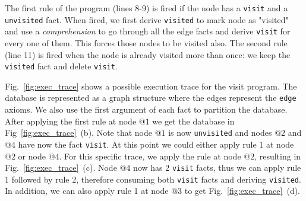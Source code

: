 The first rule of the program (lines 8-9) is fired if the node has a \texttt{visit} and a \texttt{unvisited} fact. When fired, we first derive \texttt{visited} to mark node as "visited" and use a
\emph{comprehension} to go through all the edge facts and derive \texttt{visit} for every one of them.
This forces those nodes to be visited also. The second rule (line 11) is fired when the node is already
visited more than once: we keep the \texttt{visited} fact and delete \texttt{visit}.

Fig.~\ref{fig:exec_trace} shows a possible execution trace for the visit program.
The database is represented as a graph structure where the edges represent the \texttt{edge}
axioms. We also use the first argument of each fact to partition the database.
After applying the first rule at node $@1$ we get the database in Fig~\ref{fig:exec_trace}~(b). Note that node $@1$ is now \texttt{unvisited} and nodes $@2$
and $@4$ have now the fact \texttt{visit}. At this point we could either apply rule 1 at
node $@2$ or node $@4$. For this specific trace, we apply the rule at node $@2$, resulting
in Fig.~\ref{fig:exec_trace}~(c). Node $@4$ now has 2 \texttt{visit} facts, thus
we can apply rule 1 followed by rule 2, therefore consuming both \texttt{visit} facts
and deriving \texttt{visited}. In addition, we can also apply rule 1 at node $@3$ to
get Fig.~\ref{fig:exec_trace}~(d).

